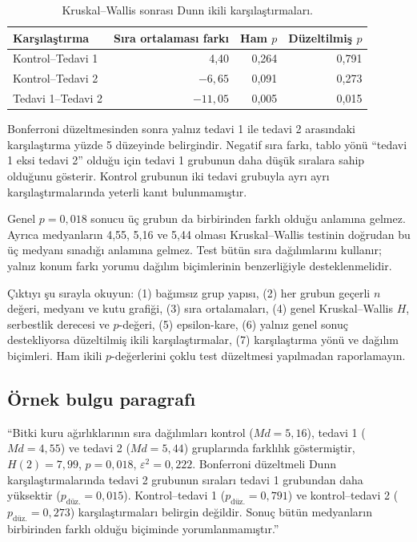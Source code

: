 \begin{table}[htbp]
\centering
\caption{Kruskal--Wallis sonrası Dunn ikili karşılaştırmaları.}
\begin{tabular}{@{}lrrr@{}}
\toprule
Karşılaştırma & Sıra ortalaması farkı & Ham $p$ & Düzeltilmiş $p$ \\
\midrule
Kontrol--Tedavi 1 & 4,40 & 0,264 & 0,791 \\
Kontrol--Tedavi 2 & $-6{,}65$ & 0,091 & 0,273 \\
Tedavi 1--Tedavi 2 & $-11{,}05$ & 0,005 & 0,015 \\
\bottomrule
\end{tabular}
\end{table}

Bonferroni düzeltmesinden sonra yalnız tedavi 1 ile tedavi 2 arasındaki
karşılaştırma yüzde 5 düzeyinde belirgindir. Negatif sıra farkı, tablo yönü
``tedavi 1 eksi tedavi 2'' olduğu için tedavi 1 grubunun daha düşük sıralara
sahip olduğunu gösterir. Kontrol grubunun iki tedavi grubuyla ayrı ayrı
karşılaştırmalarında yeterli kanıt bulunmamıştır.

\begin{mistakebox}
Genel $p=0{,}018$ sonucu üç grubun da birbirinden farklı olduğu anlamına
gelmez. Ayrıca medyanların 4,55, 5,16 ve 5,44 olması Kruskal--Wallis testinin
doğrudan bu üç medyanı sınadığı anlamına gelmez. Test bütün sıra dağılımlarını
kullanır; yalnız konum farkı yorumu dağılım biçimlerinin benzerliğiyle
desteklenmelidir.
\end{mistakebox}

\begin{outputguidebox}
Çıktıyı şu sırayla okuyun: (1) bağımsız grup yapısı, (2) her grubun geçerli
$n$ değeri, medyanı ve kutu grafiği, (3) sıra ortalamaları, (4) genel
Kruskal--Wallis $H$, serbestlik derecesi ve $p$-değeri, (5) epsilon-kare,
(6) yalnız genel sonuç destekliyorsa düzeltilmiş ikili karşılaştırmalar,
(7) karşılaştırma yönü ve dağılım biçimleri. Ham ikili $p$-değerlerini çoklu
test düzeltmesi yapılmadan raporlamayın.
\end{outputguidebox}

\subsection{Örnek bulgu paragrafı}

``Bitki kuru ağırlıklarının sıra dağılımları kontrol ($Md=5{,}16$), tedavi 1
($Md=4{,}55$) ve tedavi 2 ($Md=5{,}44$) gruplarında farklılık göstermiştir,
$H(2)=7{,}99$, $p=0{,}018$, $\varepsilon^2=0{,}222$. Bonferroni düzeltmeli
Dunn karşılaştırmalarında tedavi 2 grubunun sıraları tedavi 1 grubundan daha
yüksektir ($p_{\text{düz.}}=0{,}015$). Kontrol--tedavi 1
($p_{\text{düz.}}=0{,}791$) ve kontrol--tedavi 2
($p_{\text{düz.}}=0{,}273$)
karşılaştırmaları belirgin değildir. Sonuç bütün medyanların birbirinden
farklı olduğu biçiminde yorumlanmamıştır.''

